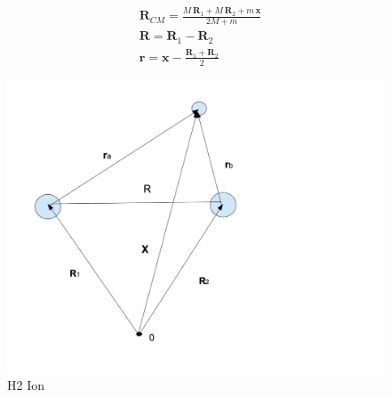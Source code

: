 \begin{equation}
\begin{split}
& \mathbf{R}_{CM} = \frac{M\,\mathbf{R}_1 + M\,\mathbf{R}_2 + m\,\mathbf{x}}{2M + m} \\[.8em]
& \mathbf{R} = \mathbf{R}_1 - \mathbf{R}_2 \\[.8em]
& \mathbf{r} = \mathbf{x} - \frac{\mathbf{R}_1 + \mathbf{R}_2}{2}
\end{split}
\end{equation}

\begin{figure}
  \includegraphics{H2Ion3D.png}
  \caption{H2 Ion}\label{h2ion3d}
\end{figure}

